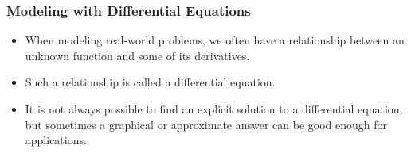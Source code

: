 \begin{frame}
\frametitle{Modeling with Differential Equations}
\begin{itemize}
\item  When modeling real-world problems, we often have a relationship between an unknown function and some of its derivatives.  
\item  Such a relationship is called a differential equation.
\item  It is not always possible to find an explicit solution to a differential equation, but sometimes a graphical or approximate answer can be good enough for applications.
\end{itemize}
\end{frame}
